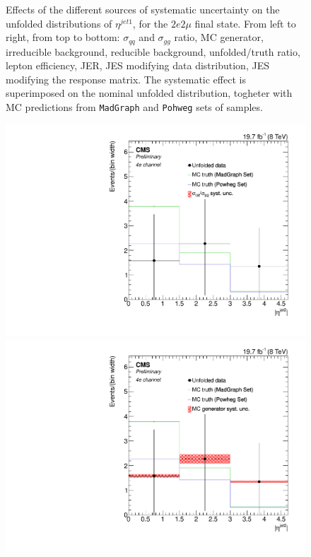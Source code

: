 \begin{figure}[hbtp]
\begin{center}
   \caption{Effects of the different sources of systematic uncertainty on the unfolded distributions of $\eta^{jet1}$, for the     
   $2e2\mu$ final state. From left to right, from top to bottom: $\sigma_{qq}$ and $\sigma_{gg}$ ratio, MC generator, irreducible background, reducible background, unfolded/truth ratio, lepton efficiency, JER, JES modifying data distribution, JES modifying the response matrix. The systematic effect is superimposed on the nominal unfolded distribution, togheter with MC predictions from \texttt{MadGraph} and \texttt{Pohweg} sets of samples.}
   \label{fig:EtaJet1syst2e2m}
 \end{center}
\end{figure}

\begin{figure}[hbtp]
 \begin{center}
   \includegraphics[width=0.8\cmsFigWidth]{Figures/Unfolding/Systematics/ZZTo4e_EtaJet2_qqgg_Mad_fr}     
   \includegraphics[width=0.8\cmsFigWidth]{Figures/Unfolding/Systematics/ZZTo4e_EtaJet2_MCgen_Mad_fr}     

\end{center}
\end{figure}
